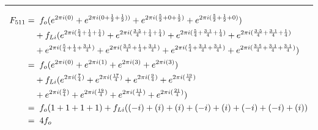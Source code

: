 \documentclass{article}
\begin{document}
\noindent\rule{12cm}{0.4pt}
\begin{align*}
	F_{511} =& \hspace{0.2cm}  f_{o}  (e^{2 \pi i (0)} 
	+ e^{2 \pi i (0 + \frac{1}{2} + \frac{1}{2}))} 
	+ e^{2 \pi i (\frac{5}{2} + 0 + \frac{1}{2})} 
	+ e^{2 \pi i (\frac{5}{2} + \frac{1}{2} + 0)})  \\
	&+ f_{Li} (e^{2 \pi i (\frac{5}{4} + \frac{1}{4} + \frac{1}{4})}  
	+ e^{2 \pi i (\frac{3 \cdot 5}{4} + \frac{1}{4} + \frac{1}{4})} 
	+ e^{2 \pi i (\frac{5}{4} + \frac{3 \cdot 1}{4} + \frac{1}{4})} 
	+ e^{2 \pi i (\frac{3 \cdot 5}{4} + \frac{3 \cdot 1}{4} + \frac{1}{4})} \\
	&+ e^{2 \pi i (\frac{5}{4} + \frac{1}{4} + \frac{3 \cdot 1}{4})}
	+ e^{2 \pi i (\frac{3 \cdot 5}{4} + \frac{1}{4} + \frac{3 \cdot 1}{4})} 
	+ e^{2 \pi i (\frac{5}{4} + \frac{3 \cdot 1}{4} + \frac{3 \cdot 1}{4})} 
	+ e^{2 \pi i (\frac{3 \cdot 5}{4} + \frac{3 \cdot 1}{4} + \frac{3 \cdot 1}{4})}) \\  
	=& \hspace{0.2cm}  f_{o}  (e^{2 \pi i (0)} 
	+ e^{2 \pi i (1)} 
	+ e^{2 \pi i (3)} 
	+ e^{2 \pi i (3)})  \\
	&+ f_{Li} (e^{2 \pi i (\frac{7}{4})}  
	+ e^{2 \pi i (\frac{17}{4})} 
	+ e^{2 \pi i (\frac{9}{4})} 
	+ e^{2 \pi i (\frac{19}{4})} \\
	&+ e^{2 \pi i (\frac{9}{4})}
	+ e^{2 \pi i (\frac{19}{4})} 
	+ e^{2 \pi i (\frac{11}{4})} 
	+ e^{2 \pi i (\frac{21}{4})}) \\
	=& \hspace{0.2cm}  f_{o}  (1  + 1 + 1 + 1) + f_{Li}((-i) + (i) + (i) + (-i) + (i) + (-i) + (-i) + (i)) \\
	=& \hspace{0.2cm} 4f_{o} 
\end{align*}
\end{document}

